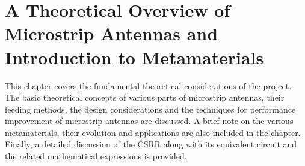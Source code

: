 \chapter{A Theoretical Overview of Microstrip Antennas and Introduction to Metamaterials}
\label{chap:chap2}
This chapter covers the fundamental theoretical considerations of the project. The basic theoretical concepts of various parts of microstrip antennas, their feeding methods, the design considerations and the techniques for performance improvement of microstrip antennas are discussed. A brief note on the various metamaterials, their evolution and applications are also included in the chapter. Finally, a detailed discussion of the CSRR along with its equivalent circuit and the related mathematical expressions is provided.

